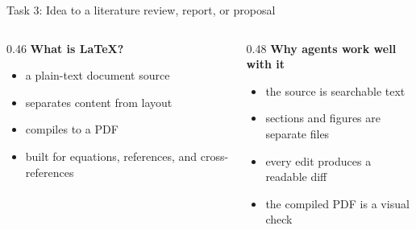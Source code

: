 

\begin{frame}{Task 3: Idea to a literature review, report, or proposal}
  \vfill
  \begin{columns}[t]
    \begin{column}{0.46\textwidth}
      \textbf{What is \LaTeX?}
      \begin{itemize}\small\setlength\itemsep{0.4em}
        \item a plain-text document source
        \item separates content from layout
        \item compiles to a PDF
        \item built for equations, references, and cross-references
      \end{itemize}
    \end{column}
    \begin{column}{0.48\textwidth}
      \textbf{Why agents work well with it}
      \begin{itemize}\small\setlength\itemsep{0.4em}
        \item the source is searchable text
        \item sections and figures are separate files
        \item every edit produces a readable diff
        \item the compiled PDF is a visual check
      \end{itemize}
    \end{column}
  \end{columns}
  \vspace{1.0em}
  \begin{center}
  \end{center}
  \vspace{1.1cm plus 1fill}
\end{frame}

